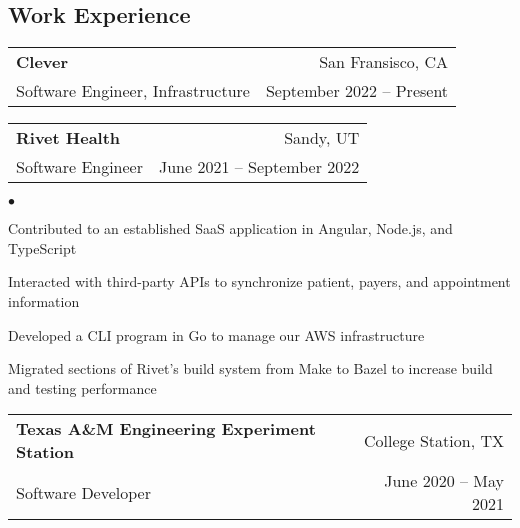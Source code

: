 \documentclass[margin, 11pt]{res}
\makeatletter
\newcommand{\li}{https://linkedin.com/in/jakegut}
\newcommand{\gh}{https://github.com/jakegut}
\newcommand{\personalsite}{https://jakegut.com}
\newcommand{\resumeSubheading}[4]{

\begin{tabular*}{1.01\textwidth}{@{\hspace{-4pt}}l @{\extracolsep{\fill}} r}
\textbf{#1} & #2 \\
      {#3} &  {#4}
\end{tabular*}\vspace{-2pt}
}
\newenvironment{list2}{
	\begin{list}{$\bullet$}{%
	    \small
		\setlength{\itemsep}{0in}
		\setlength{\parsep}{0in} \setlength{\parskip}{0in}
		\setlength{\topsep}{0in} \setlength{\partopsep}{0in}
		\setlength{\leftmargin}{0.2in}}}{\end{list}}
\makeatother
\begin{document}
\address{
    \small 979-676-3030 $|$ 
    \href{mailto:jakegut0108@gmail.com}{jakegut0108@gmail.com} $|$ 
    \href{\li}{linkedin.com/in/jakegut} $|$
    \href{\gh}{github.com/jakegut}
}

\begin{resume}

\section{\sc Work Experience}

\vspace{2pt}

\resumeSubheading{{\bf Clever}}{San Fransisco, CA}
                 {Software Engineer, Infrastructure}{September 2022 -- Present}
                 
\resumeSubheading{{\bf Rivet Health}}{Sandy, UT}
                 {Software Engineer}{June 2021 -- September 2022}
                 
\begin{list2}
\item{Contributed to an established SaaS application in Angular, Node.js, and TypeScript}
\item{Interacted with third-party APIs to synchronize patient, payers, and appointment information}
\item{Developed a CLI program in Go to manage our AWS infrastructure}
\item{Migrated sections of Rivet's build system from Make to Bazel to increase build and testing performance}
\end{list2}

\resumeSubheading{{\bf Texas A\&M Engineering Experiment Station}}{College Station, TX}
                 {Software Developer}{June 2020 -- May 2021}


\end{resume}
\end{document}

